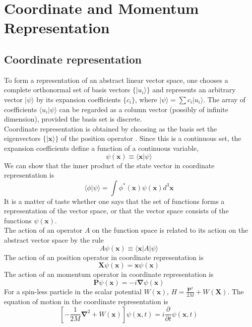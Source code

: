 \chapter{Coordinate and Momentum Representation}
\section{Coordinate representation}
To form a representation of an abstract linear vector space, one chooses a complete orthonormal set of basis vectors $\{|u_i\rangle\}$ and represents an arbitrary vector $|\psi\rangle$ by its expansion coefficients $\{c_i\}$, where $|\psi\rangle = \sum c_i |u_i\rangle$. 
The array of coefficients $\langle u_i | \psi \rangle$ can be regarded as a column vector (possibly of infinite dimension), provided the basis set is discrete.\\
Coordinate representation is obtained by choosing as the basis set the eigenvectors $\{|\bm{x}\rangle\}$ of the position operator . Since this is a continuous set, the expansion coefficients define a function of a continuous variable,
\[\psi(\bm{x})  \equiv \langle \bm{x} | \psi \rangle\]
We can show that the inner product of the state vector in coordinate representation is
\[\langle \phi | \psi \rangle = \int \phi^{*}(\bm{x})\psi(\bm{x}) d^3\bm{x} \]
It is a matter of taste whether one says that the set of functions forms a representation of the vector space, or that the vector space consists of the functions $\psi(\bm{x})$.\\
The action of an operator $A$ on the function space is related to its action on the abstract vector space by the rule
\[A \psi(\bm{x}) \equiv  \langle \bm{x} |A| \psi \rangle\]
The action of an position operator in coordinate representation is
\[\bm{X}\psi(\bm{x}) = \bm{x} \psi(\bm{x})\]
The action of an momentum operator in coordinate representation is
\[\bm{P}\psi(\bm{x}) = -i \bm{\nabla}\psi(\bm{x})\]
For a spin-less particle in the scalar potential $W(\bm{x})$,
$H = \frac{\bm{P}^2}{2M} + W(\bm{X})$. 
The equation of motion in the coordinate representation is
\[ \left[- \frac{1}{2M} \bm{\nabla}^2 + W(\bm{x}) \right] \psi(\bm{x},t) = i\frac{\partial}{\partial t}\psi(\bm{x},t)\]

